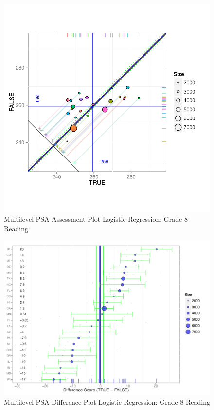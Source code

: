 \begin{figure}[h!]
\begin{center}
\includegraphics[width=\textwidth]{../Figures2009/g8read-mlpsa-lr-circ.pdf}
\caption{Multilevel PSA Assessment Plot Logistic Regression: Grade 8 Reading}
\end{center}
\end{figure}

\begin{figure}[h!]
\begin{center}
\includegraphics[width=\textwidth]{../Figures2009/g8read-mlpsa-lr-diff.pdf}
\caption{Multilevel PSA Difference Plot Logistic Regression: Grade 8 Reading}
\end{center}
\end{figure}


